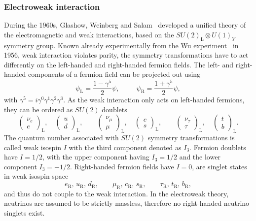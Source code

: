 \subsubsection{Electroweak interaction}
\label{sec:ewk_interaction}

During the 1960s, Glashow, Weinberg and Salam~\cite{GLASHOW1961579,PhysRevLett.19.1264,Salam1959} developed a unified theory of the electromagnetic and weak interactions, based on the $SU(2)_\mathrm{L}\otimes U(1)_Y$ symmetry group. Known already experimentally from the Wu experiment~\cite{PhysRev.105.1413} in 1956, weak interaction violates parity, \ie the symmetry transformations have to act differently on the left-handed and right-handed fermion fields. The left- and right-handed components of a fermion field can be projected out using
\begin{equation}
	\psi_\mathrm{L} = \frac{1-\gamma^5}{2}\psi , \ \ \qquad 	\psi_\mathrm{R} = \frac{1+\gamma^5}{2}\psi,
\end{equation}
with $\gamma^5 = i\gamma^0\gamma^1\gamma^2\gamma^3$. As the weak interaction only acts on left-handed fermions, they can be ordered as $SU(2)$ doublets
\begin{equation}
	\begin{pmatrix}
		\nu_e \\
		e
	\end{pmatrix}_\mathrm{L},
	\quad
	\begin{pmatrix}
		u \\
		d
	\end{pmatrix}_\mathrm{L},
	\qquad
	\begin{pmatrix}
		\nu_\mu \\
		\mu
	\end{pmatrix}_\mathrm{L},
	\quad
	\begin{pmatrix}
		c \\
		s
	\end{pmatrix}_\mathrm{L},
	\qquad
	\begin{pmatrix}
		\nu_\tau \\
		\tau
	\end{pmatrix}_\mathrm{L},
	\quad
	\begin{pmatrix}
		t \\
		b
	\end{pmatrix}_\mathrm{L}.
\end{equation} 
The quantum number associated with $SU(2)$ symmetry transformations is called weak isospin $I$ with the third component denoted as $I_3$. Fermion doublets have $I=1/2$, with the upper component having $I_3 = 1/2$ and the lower component $I_3=-1/2$. Right-handed fermion fields have $I=0$, \ie are singlet states in weak isospin space
\begin{equation}
	e_\mathrm{R},\,  u_\mathrm{R},\,  d_\mathrm{R}, \qquad \mu_\mathrm{R},\,  c_\mathrm{R},\,  s_\mathrm{R}, \qquad \tau_\mathrm{R},\,  t_\mathrm{R},\,  b_\mathrm{R}, 
\end{equation}
and thus do not couple to the weak interaction. In the electroweak theory, neutrinos are assumed to be strictly massless, therefore no right-handed neutrino singlets exist. 

